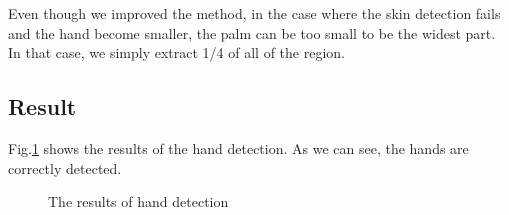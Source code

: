 Even though we improved the method, in the case where the skin detection fails and the hand become smaller,  the palm can be too small to be the widest part. In that case, we simply extract 1/4 of all of the region.
\subsection{Result}
Fig.\ref{fig:hands} shows the results of the hand detection.
As we can see, the hands are correctly detected.

\begin{landscape}
\begin{figure}[htbp]
 \centering
 
 \caption{The results of hand detection}
 \label{fig:hands}
\end{figure}
\end{landscape}

